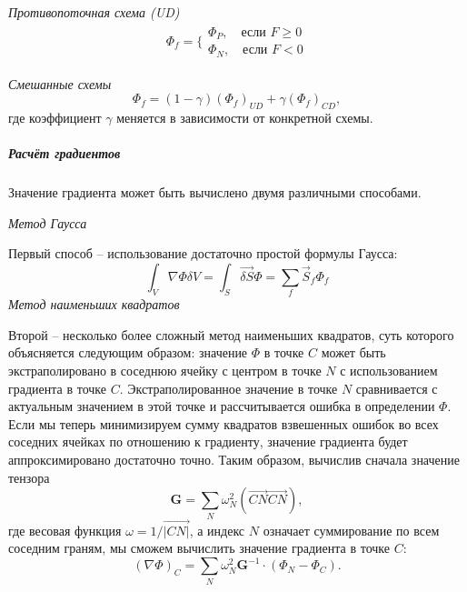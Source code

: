 		\textit{Противопоточная схема (UD)}
		\begin{equation}
			\begin{aligned}
				\Phi_f = \Bigg\{	\begin{array}{l}
					\Phi_P, \quad \text{если } F \geq 0 \\
					\Phi_N, \quad \text{если } F < 0
				\end{array}
			\end{aligned}
		\end{equation}
		
		\textit{Смешанные схемы}
		\begin{equation}
			\Phi_f = \left(1-\gamma\right)(\Phi_f)_{UD} + \gamma (\Phi_f)_{CD},
		\end{equation}
		где коэффициент $\gamma$ меняется в зависимости от конкретной схемы.
		
		\subparagraph{Расчёт градиентов\\}
		
		    Значение градиента может быть вычислено двумя различными способами.
			
			\textit{Метод Гаусса}
			
			Первый способ -- использование достаточно простой формулы Гаусса:
			\begin{equation}
				\int_V \nabla \Phi \delta V = \int_S \vec{\delta S} \Phi = \sum_f \vec{S}_f \Phi_f
			\end{equation}
			\textit{Метод наименьших квадратов}
			
			Второй -- несколько более сложный метод наименьших квадратов, суть которого объясняется следующим образом: значение $\Phi$ в точке $C$ может быть экстраполировано в соседнюю ячейку с центром в точке $N$ с использованием градиента в точке $C$. Экстраполированное значение в точке $N$ сравнивается с актуальным значением в этой точке и рассчитывается ошибка в определении $\Phi$. Если мы теперь минимизируем сумму квадратов взвешенных ошибок во всех соседних ячейках по отношению к градиенту, значение градиента будет аппроксимировано достаточно точно. Таким образом, вычислив сначала значение тензора
			\begin{equation}
				\mathbf{G} = \sum_N \omega_N^2 (\vec{CN}\vec{CN}),
			\end{equation}
			где весовая функция $\omega = 1/\vec{|CN|}$, а индекс $N$ означает суммирование по всем соседним граням, мы сможем вычислить значение градиента в точке $C$:
			\begin{equation}
				(\nabla \Phi)_C = \sum_N \omega_N^2 \mathbf{G}^{-1} \cdot  (\Phi_N - \Phi_C).
			\end{equation}
